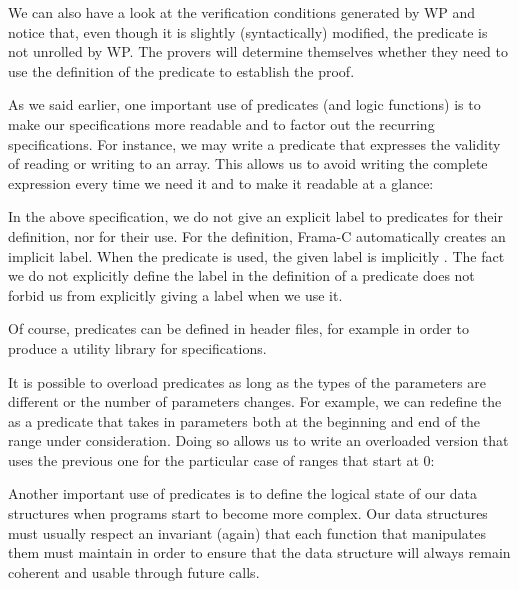We can also have a look at the verification conditions generated by WP and
notice that, even though it is slightly (syntactically) modified, the predicate is not
unrolled by WP. The provers will determine themselves whether they need to use
the definition of the predicate to establish the proof.






As we said earlier, one important use of predicates (and logic
functions) is to make our specifications more readable and to factor
out the recurring specifications. For instance, we may
write a predicate that expresses the validity of reading or writing to an
array. This allows us to avoid writing the complete
expression every time we need it and to make it readable at a glance:






In the above specification, we do not give an explicit label to predicates
for their definition, nor for their use. For the definition, Frama-C
automatically creates an implicit label. When the predicate is used, the given
label is implicitly . The fact we do not explicitly define
the label in the definition of a predicate does not forbid us from explicitly
giving a label when we use it.

Of course, predicates can be defined in header files, for example in order to produce
a utility library for specifications.






It is possible to overload predicates as long as the types of the
parameters are different or the number of parameters changes. For
example, we can redefine the  as a
predicate that takes in parameters both at the beginning and end
of the range under consideration. Doing so allows us to write an overloaded version that
uses the previous one for the particular case of ranges that start
at 0:









Another important use of predicates is to define the logical state of
our data structures when programs start to become more complex. Our data
structures must usually respect an invariant (again) that each
function that manipulates them must maintain in order to ensure that the data
structure will always remain coherent and usable through future calls.



